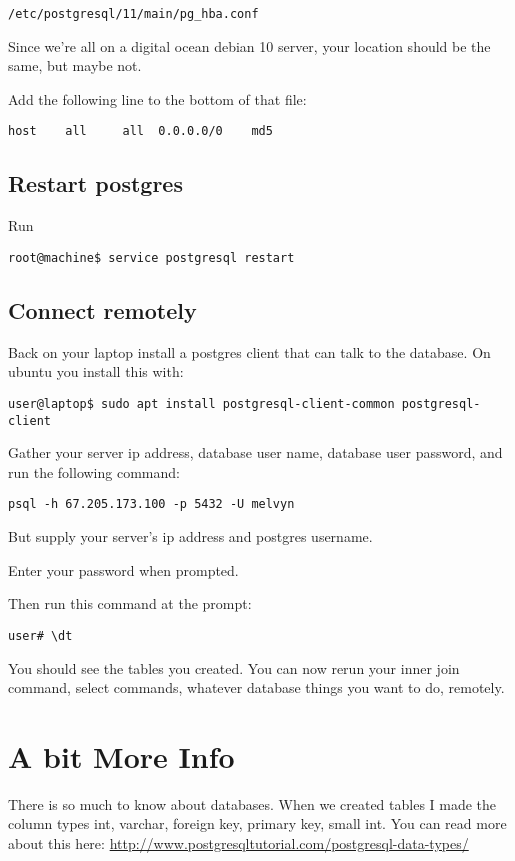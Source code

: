 \documentclass[12pt]{article}
\begin{document}
\begin{verbatim}
/etc/postgresql/11/main/pg_hba.conf 
\end{verbatim}

Since we're all on a digital ocean debian 10 server, your location should be the same, but maybe not. 

Add the following line to the bottom of that file:

\begin{verbatim}
host    all     all  0.0.0.0/0    md5
\end{verbatim}

\subsection{Restart postgres}
Run
\begin{lstlisting}
root@machine$ service postgresql restart
\end{lstlisting}

\subsection{Connect remotely}

Back on your laptop install a postgres client that can talk to the database. On ubuntu you install this with:

\begin{verbatim}
user@laptop$ sudo apt install postgresql-client-common postgresql-client
\end{verbatim}

Gather your server ip address, database user name, database user password, and run the following command:

\begin{verbatim}
psql -h 67.205.173.100 -p 5432 -U melvyn
\end{verbatim}

But supply your server's ip address and postgres username.

Enter your password when prompted.

Then run this command at the prompt:

\begin{verbatim}
user# \dt
\end{verbatim}

You should see the tables you created. You can now rerun your inner join command, select commands, whatever database things you want to do, remotely.

\section{A bit More Info}
There is so much to know about databases. When we created tables I made the column types int, varchar, foreign key, primary key, small int. You can read more about this here:
\url{http://www.postgresqltutorial.com/postgresql-data-types/}
\end{document}
